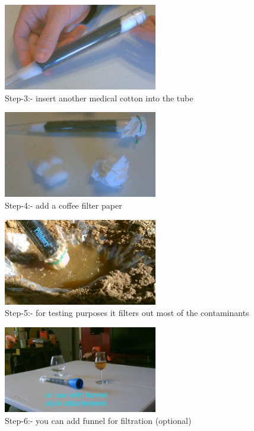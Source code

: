\documentclass{article}
\begin{document}
\begin{figure}[h!]
    \centering
    \includegraphics[width=0.6\textwidth]{DIY/materials-5jpg.jpg}
    \caption{Step-3:- insert another medical cotton into the tube}
    \label{fig:market}
\end{figure}

\begin{figure}[h!]
    \centering
    \includegraphics[width=0.6\textwidth]{DIY/material-6.jpg}
    \caption{Step-4:- add a coffee filter paper}
    \label{fig:market}
\end{figure}

\begin{figure}[h!]
    \centering
    \includegraphics[width=0.6\textwidth]{DIY/material-7.jpg}
    \caption{Step-5:- for testing purposes it filters out most of the contaminants}
    \label{fig:market}
\end{figure}

\begin{figure}[h!]
    \centering
    \includegraphics[width=0.6\textwidth]{DIY/material-8.jpg}
    \caption{Step-6:- you can add funnel for filtration (optional)}
    \label{fig:market}
\end{figure}
\end{document}
